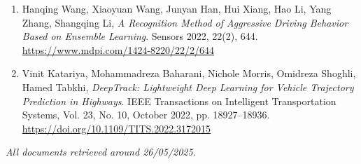 \documentclass[12pt,a4paper]{article}
\begin{document}
\begin{enumerate}
    \item Hanqing Wang, Xiaoyuan Wang, Junyan Han, Hui Xiang, Hao Li, Yang Zhang, Shangqing Li, \textit{A Recognition Method of Aggressive Driving Behavior Based on Ensemble Learning}. Sensors 2022, 22(2), 644. \url{https://www.mdpi.com/1424-8220/22/2/644}
    
    \item Vinit Katariya, Mohammadreza Baharani, Nichole Morris, Omidreza Shoghli, Hamed Tabkhi, \textit{DeepTrack: Lightweight Deep Learning for Vehicle Trajectory Prediction in Highways}. IEEE Transactions on Intelligent Transportation Systems, Vol. 23, No. 10, October 2022, pp. 18927–18936. \url{https://doi.org/10.1109/TITS.2022.3172015}
\end{enumerate}

\bigskip
\noindent\textit{All documents retrieved around 26/05/2025.}
\end{document}
